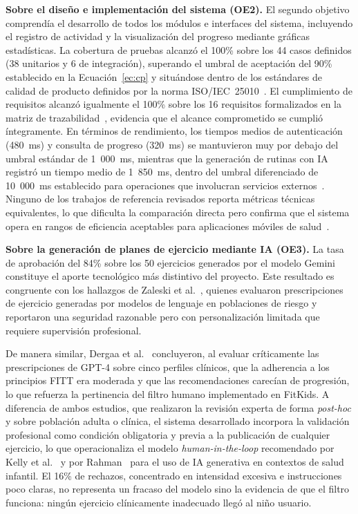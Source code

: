 			\textbf{Sobre el diseño e implementación del sistema (OE2).} El segundo objetivo comprendía el desarrollo de todos los módulos e interfaces del sistema, incluyendo el registro de actividad y la visualización del progreso mediante gráficas estadísticas. La cobertura de pruebas alcanzó el 100\% sobre los 44 casos definidos (38 unitarios y 6 de integración), superando el umbral de aceptación del 90\% establecido en la Ecuación~\eqref{ec:cp} y situándose dentro de los estándares de calidad de producto definidos por la norma ISO/IEC~25010~\cite{GuerreroUlloa2024}. El cumplimiento de requisitos alcanzó igualmente el 100\% sobre los 16 requisitos formalizados en la matriz de trazabilidad~\cite{Gotel1994}, evidencia que el alcance comprometido se cumplió íntegramente. En términos de rendimiento, los tiempos medios de autenticación (480~ms) y consulta de progreso (320~ms) se mantuvieron muy por debajo del umbral estándar de 1~000~ms, mientras que la generación de rutinas con IA registró un tiempo medio de 1~850~ms, dentro del umbral diferenciado de 10~000~ms establecido para operaciones que involucran servicios externos~\cite{GuerreroUlloa2024}. Ninguno de los trabajos de referencia revisados reporta métricas técnicas equivalentes, lo que dificulta la comparación directa pero confirma que el sistema opera en rangos de eficiencia aceptables para aplicaciones móviles de salud~\cite{Kleppmann2017}.
			
			\textbf{Sobre la generación de planes de ejercicio mediante IA (OE3).} La tasa de aprobación del 84\% sobre los 50 ejercicios generados por el modelo Gemini constituye el aporte tecnológico más distintivo del proyecto. Este resultado es congruente con los hallazgos de Zaleski et al.~\cite{Zaleski2026}, quienes evaluaron prescripciones de ejercicio generadas por modelos de lenguaje en poblaciones de riesgo y reportaron una seguridad razonable pero con personalización limitada que requiere supervisión profesional.
			
			De manera similar, Dergaa et al.~\cite{Dergaa2024} concluyeron, al evaluar críticamente las prescripciones de GPT-4 sobre cinco perfiles clínicos, que la adherencia a los principios FITT era moderada y que las recomendaciones carecían de progresión, lo que refuerza la pertinencia del filtro humano implementado en FitKids. A diferencia de ambos estudios, que realizaron la revisión experta de forma \textit{post-hoc} y sobre población adulta o clínica, el sistema desarrollado incorpora la validación profesional como condición obligatoria y previa a la publicación de cualquier ejercicio, lo que operacionaliza el modelo \textit{human-in-the-loop} recomendado por Kelly et al.~\cite{Yim2024} y por Rahman~\cite{Sengar2024} para el uso de IA generativa en contextos de salud infantil. El 16\% de rechazos, concentrado en intensidad excesiva e instrucciones poco claras, no representa un fracaso del modelo sino la evidencia de que el filtro funciona: ningún ejercicio clínicamente inadecuado llegó al niño usuario.
			
